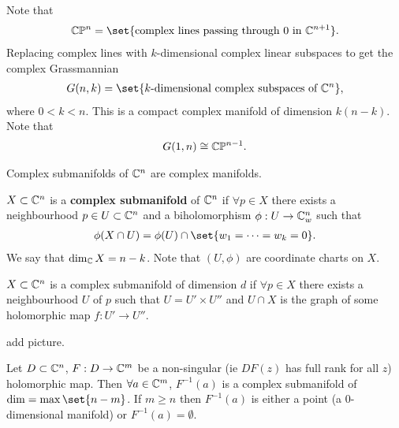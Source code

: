 \begin{example}
    Note that
    \begin{align*}
        \C\PP^n = \set{ \text{complex lines passing through } 0 \text{ in } \C^{n+1} }.
    \end{align*}
    Replacing complex lines with $k$-dimensional complex linear subspaces to get the complex Grassmannian
    \begin{align*}
        G(n,k) = \set{ k \text{-dimensional complex subspaces of } \C^n },
    \end{align*}
    where $0 < k < n$. This is a compact complex manifold of dimension $k (n-k)$. Note that
    \begin{align*}
        G(1,n) \cong \mathbb{C} \mathbb{P}^{n-1}.
    \end{align*}
\end{example}

\begin{example}
    Complex submanifolds of $\mathbb{C}^n$ are complex manifolds.
\end{example}

\begin{definition}
    $X \subset \mathbb{C}^n$ is a \textbf{complex submanifold} of $\mathbb{C}^n$ if $\forall p \in X$ there exists a neighbourhood $p \in U \subset \mathbb{C}^n$ and a biholomorphism $\phi : U \to \mathbb{C}^n_w$ such that
    \begin{align*}
        \phi(X \cap U) = \phi(U) \cap \set{  w_1 = \cdots = w_k = 0 }.
    \end{align*}
    We say that $\dim_{\mathbb{C}} X = n-k$. Note that $(U,\phi)$ are coordinate charts on $X$.
\end{definition}

\begin{exercise}
    $X \subset \mathbb{C}^n$ is a complex submanifold of dimension $d$ if $\forall p \in X$ there exists a neighbourhood $U$ of $p$ such that $U = U' \times U''$ and $U \cap X$ is the graph of some holomorphic map $f : U' \to U''$.

    add picture.
\end{exercise}

\begin{theorem}
    Let $D  \subset \mathbb{C}^n$, $F : D \to \mathbb{C}^m$ be a non-singular (ie $DF(z)$ has full rank for all $z$) holomorphic map. Then $\forall a \in \mathbb{C}^m$, $F^{-1}(a)$ is a complex submanifold of $\dim = \max \set{n-m}$. If $m \geq n$ then $F^{-1}(a) $ is either a point (a $0$-dimensional manifold) or $F^{-1}(a) = \emptyset$.
\end{theorem}


